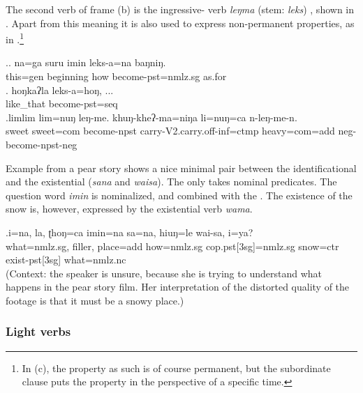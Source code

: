 The second verb of frame (b) is the ingressive- verb \emph{leŋma} (stem: \emph{leks}) , shown in \Next. Apart from this meaning it is also used to express non-permanent properties, as in \Next[c].\footnote{In (c), the property as such is of course permanent, but the subordinate clause puts the property in the perspective of a specific time.}

\ex.\ag. na=ga  suru   imin leks-a=na    baŋniŋ.\\
		this{\sc =gen} beginning how become{\sc [3sg]-pst=nmlz.sg} as.for\\
	 
	\bg.  hoŋkaʔla  leks-a=hoŋ, ...\\
	like\_that become{\sc [3sg]-pst=seq}\\
 
\bg.limlim lim=nuŋ leŋ-me.     khuŋ-kheʔ-ma=niŋa          li=nuŋ=ca    n-leŋ-me-n.\\
sweet sweet{\sc =com} become{\sc [3sg]-npst} carry{\sc -V2.carry.off-inf=ctmp} heavy{\sc =com=add} {\sc neg-}become{\sc [3sg]-npst-neg}\\


Example \Next from a pear story shows a nice minimal pair between the identificational and the existential  (\emph{sana} and \emph{waisa}). The  only takes nominal predicates. The question word \emph{imin}  is nominalized, and combined with the . The existence of the snow is, however, expressed by the existential  verb \emph{wama}.

\exg.i=na, la, ʈhoŋ=ca       imin=na       sa=na,        hiuŋ=le      wai-sa,  i=ya?\\
what{\sc =nmlz.sg}, {\sc filler}, place{\sc =add} how{\sc =nmlz.sg} {\sc cop.pst[3sg]=nmlz.sg} snow{\sc =ctr} exist{\sc -pst[3sg]} what{\sc =nmlz.nc}\\
 (Context: the speaker is unsure, because she is trying to understand what happens in the pear story film. Her interpretation of the distorted quality of the footage is that it must be a snowy place.)	

\subsubsection{Light verbs}

